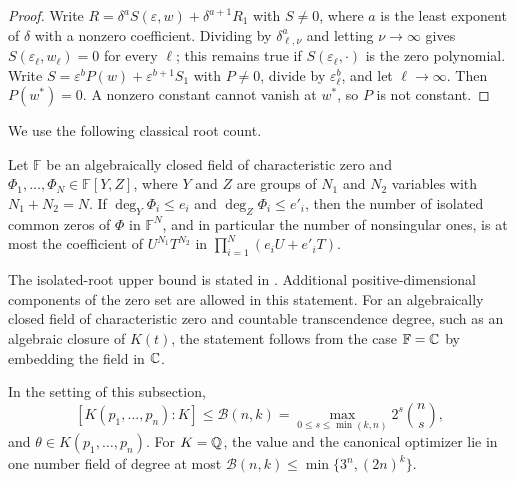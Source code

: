 \begin{proof}
Write $R=\delta^aS(\varepsilon,w)+\delta^{a+1}R_1$ with $S\ne0$, where $a$
is the least exponent of $\delta$ with a nonzero coefficient. Dividing by
$\delta_{\ell,\nu}^a$ and letting $\nu\to\infty$ gives
$S(\varepsilon_\ell,w_\ell)=0$ for every $\ell$; this remains true if
$S(\varepsilon_\ell,\cdot)$ is the zero polynomial. Write
$S=\varepsilon^bP(w)+\varepsilon^{b+1}S_1$ with $P\ne0$, divide by
$\varepsilon_\ell^b$, and let $\ell\to\infty$. Then $P(w^*)=0$. A nonzero
constant cannot vanish at $w^*$, so $P$ is not constant.
\end{proof}

We use the following classical root count.

\begin{theorem}
\label{thm:qc-bezout}
Let $\mathbb F$ be an algebraically closed field of characteristic zero and
$\Phi_1,\ldots,\Phi_N\in\mathbb F[Y,Z]$, where $Y$ and $Z$ are groups of $N_1$
and $N_2$ variables with $N_1+N_2=N$. If $\deg_Y\Phi_i\le e_i$ and
$\deg_Z\Phi_i\le e'_i$, then the number of isolated common zeros of $\Phi$ in
$\mathbb F^N$, and in particular the number of nonsingular ones, is at most the
coefficient of $U^{N_1}T^{N_2}$ in $\prod_{i=1}^N(e_iU+e'_iT)$.
\end{theorem}

The isolated-root upper bound is stated in
\cite[Section~5, Theorem~5.1]{DedieuMalajovichShub2005}.
Additional positive-dimensional components of the zero set are allowed in
this statement. For an algebraically closed field of characteristic zero and
countable transcendence degree, such as an algebraic closure of $K(t)$, the
statement follows from the case $\mathbb F=\mathbb C$ by embedding the field in $\mathbb C$.

\begin{theorem}
\label{thm:qc-degree}
In the setting of this subsection,
\[
[K(p_1,\ldots,p_n):K]\le\mathcal B(n,k)=\max_{0\le s\le\min(k,n)}2^s\binom ns,
\]
and $\theta\in K(p_1,\ldots,p_n)$. For $K=\mathbb Q$, the value and the canonical
optimizer lie in one number field of degree at most $\mathcal B(n,k)\le
\min\{3^n,(2n)^k\}$.
\end{theorem}

